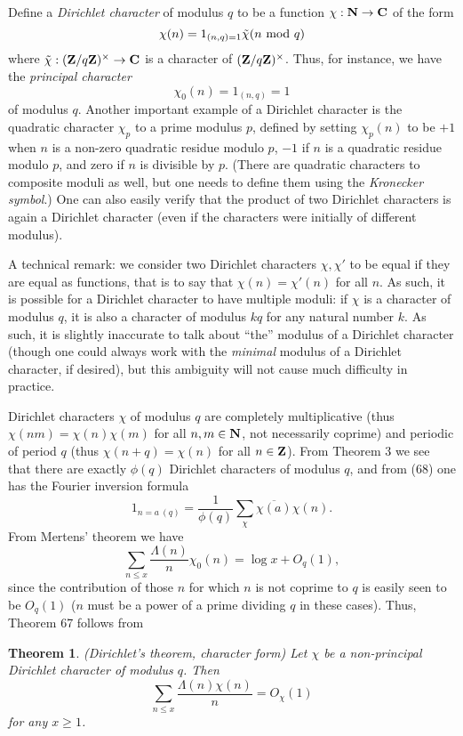 \documentclass[10pt,reqno]{amsart}
\newtheorem{theorem}{Theorem}
\begin{document}
Define a \emph{Dirichlet character} of modulus $q$ to be a function $\chi: {\bf N} \rightarrow {\bf C}$ of the form
%
\[  \chi(n) = 1_{(n,q)=1} \tilde \chi( n \hbox{ mod } q )\]
%
where $\tilde \chi: ({\bf Z}/q{\bf Z})^\times \rightarrow {\bf C}$ is a character of $({\bf Z}/q{\bf Z})^\times$. Thus, for instance, we have the \emph{principal character}
%
\[  \chi_0(n) = 1_{(n,q)}=1\]
%
of modulus $q$. Another important example of a Dirichlet character is the quadratic character $\chi_p$ to a prime modulus $p$, defined by setting $\chi_p(n)$ to be $+1$ when $n$ is a non-zero quadratic residue modulo $p$, $-1$ if $n$ is a quadratic residue modulo $p$, and zero if $n$ is divisible by $p$. (There are quadratic characters to composite moduli as well, but one needs to define them using the \emph{Kronecker symbol}.) One can also easily verify that the product of two Dirichlet characters is again a Dirichlet character (even if the characters were initially of different modulus).

A technical remark: we consider two Dirichlet characters $\chi, \chi'$ to be equal if they are equal as functions, that is to say that $\chi(n)=\chi'(n)$ for all $n$. As such, it is possible for a Dirichlet character to have multiple moduli: if $\chi$ is a character of modulus $q$, it is also a character of modulus $kq$ for any natural number $k$. As such, it is slightly inaccurate to talk about “the” modulus of a Dirichlet character (though one could always work with the \emph{minimal} modulus of a Dirichlet character, if desired), but this ambiguity will not cause much difficulty in practice.

Dirichlet characters $\chi$ of modulus $q$ are completely multiplicative (thus $\chi(nm)=\chi(n) \chi(m)$ for all $n,m \in {\bf N}$, not necessarily coprime) and periodic of period $q$ (thus $\chi(n+q)=\chi(n)$ for all $n \in {\bf Z}$). From Theorem 3 we see that there are exactly $\phi(q)$ Dirichlet characters of modulus $q$, and from (68) one has the Fourier inversion formula
%
\[  1_{n=a\ (q)} = \frac{1}{\phi(q)} \sum_\chi \overline{\chi(a)} \chi(n).\]
%
From Mertens’ theorem we have
%
\[  \sum_{n \leq x} \frac{\Lambda(n)}{n} \chi_0(n) = \log x + O_q(1),\]
%
since the contribution of those $n$ for which $n$ is not coprime to $q$ is easily seen to be $O_q(1)$ ($n$ must be a power of a prime dividing $q$ in these cases). Thus, Theorem 67 follows from

\begin{theorem}
    (Dirichlet’s theorem, character form) Let $\chi$ be a non-principal Dirichlet character of modulus $q$. Then
    \[  \sum_{n \leq x} \frac{\Lambda(n) \chi(n)}{n} = O_\chi(1)\]
    for any $x \geq 1$.
\end{theorem}
\end{document}
